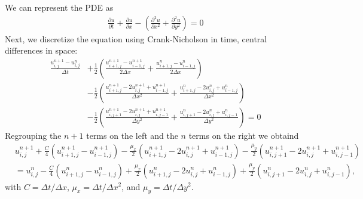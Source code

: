 \begin{questions}
\begin{solution}
We can represent the PDE as
\begin{align*}
\frac{\partial u}{\partial t} + \frac{\partial u}{\partial x} - \left(\frac{\partial^2 u}{\partial x^2} + \frac{\partial^2 u}{\partial y^2}\right) =0
\end{align*}
Next, we discretize the equation using Crank-Nicholson in time, central differences in space:
\begin{align*}
\frac{u_{i,j}^{n+1}-u_{i,j}^{n}}{\Delta t} &+ \frac{1}{2}\left( \frac{u_{i+1,j}^{n+1}-u_{i-1,j}^{n+1}}{2\Delta x} + \frac{u_{i+1,j}^{n}-u_{i-1,j}^{n}}{2\Delta x} \right) \\
&- \frac{1}{2}\left( \frac{u_{i+1,j}^{n+1}-2u_{i,j}^{n+1}+u_{i-1,j}^{n+1}}{\Delta x^2} + \frac{u_{i+1,j}^{n}-2u_{i,j}^{n}+u_{i-1,j}^{n}}{\Delta x^2} \right)\\
&- \frac{1}{2}\left( \frac{u_{i,j+1}^{n+1}-2u_{i,j}^{n+1}+u_{i,j-1}^{n+1}}{\Delta y^2} + \frac{u_{i,j+1}^{n}-2u_{i,j}^{n}+u_{i,j-1}^{n}}{\Delta y^2} \right) = 0
\end{align*}
Regrouping the $n+1$ terms on the left and the $n$ terms on the right we obtaind
\begin{align*}
&u_{i,j}^{n+1} + \frac{C}{4}\left( u_{i+1,j}^{n+1} - u_{i-1,j}^{n+1} \right) - \frac{\mu_x}{2}\left( u_{i+1,j}^{n+1} -2u_{i,j}^{n+1} + u_{i-1,j}^{n+1} \right) - \frac{\mu_y}{2}\left( u_{i,j+1}^{n+1} -2u_{i,j}^{n+1} + u_{i,j-1}^{n+1} \right) \\
& = u_{i,j}^{n} - \frac{C}{4}\left( u_{i+1,j}^{n} - u_{i-1,j}^{n} \right) + \frac{\mu_x}{2}\left( u_{i+1,j}^{n} -2u_{i,j}^{n} + u_{i-1,j}^{n} \right) + \frac{\mu_y}{2}\left( u_{i,j+1}^{n} -2u_{i,j}^{n} + u_{i,j-1}^{n} \right),
\end{align*}
with $C = \Delta t/\Delta x$, $\mu_x = \Delta t/\Delta x^2$, and $\mu_y = \Delta t/\Delta y^2$. 


\end{solution}
\end{questions}
